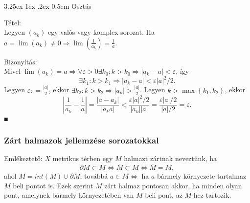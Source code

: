 \documentclass[12pt,a4paper]{scrartcl}
\makeatletter
\renewcommand\paragraph{\@startsection{paragraph}{4}{\z@}%
                                    {3.25ex \@plus1ex \@minus.2ex}%
                                    {0.5em} %
                                    {\normalfont\normalsize\bfseries}}
\newenvironment{tetel}{}{}
\newenvironment{bizonyitas}{}{}
\makeatother
\begin{document}
\hypertarget{osztas}{%
\paragraph{Osztás}\label{osztas}}

\begin{tetel}

Tétel:\\
Legyen \(\left( a_{k} \right)\) egy valós vagy komplex sorozat. Ha
\(\left. a = \lim\left( a_{k} \right) \neq 0\Rightarrow\lim\left( \frac{1}{a_{k}} \right) = \frac{1}{a} \right.\).

\end{tetel}

\begin{bizonyitas}

Bizonyítás:\\
Mivel
\(\left. \lim\left( a_{k} \right) = a\Rightarrow\forall\varepsilon > 0\exists k_{0}:k > k_{0}\Rightarrow\left| {a_{k} - a} \right| < \varepsilon \right.\),
így
\[\left. \exists k_{1}:k > k_{1}\Rightarrow\left| {a_{k} - a} \right| < \varepsilon\left| a \right|^{2}/2 \right..\]
Legyen \(\varepsilon: = \frac{\left| a \right|}{2}\), ekkor
\(\left. \exists k_{2}:k > k_{2}\Rightarrow\left| a_{k} \right| > \frac{\left| a \right|}{2} \right.\).
Legyen \(k > \max\left\{ {k_{1},k_{2}} \right\}\), ekkor
\[{\left| {\frac{1}{a_{k}} - \frac{1}{a}} \right| = \frac{\left| {a - a_{k}} \right|}{\left| {a_{k}a} \right|} < \frac{\varepsilon\left| a \right|^{2}/2}{\left| a_{k} \right|\left| a \right|} = \frac{\varepsilon\left| a \right|/2}{\left| a \right|/2} = \varepsilon}.\]
■

\end{bizonyitas}

\hypertarget{zart-halmazok-jellemzese-sorozatokkal}{%
\subsubsection{Zárt halmazok jellemzése
sorozatokkal}\label{zart-halmazok-jellemzese-sorozatokkal}}

Emlékeztető: \(X\) metrikus térben egy \(M\) halmazt zártnak neveztünk,
ha
\[\left. \partial M \subset M\Leftrightarrow\overline{M} \subset M\Leftrightarrow\overline{M} = M \right.,\]
ahol \(\overline{M} = {int}\left( M \right) \cup \partial M\), továbbá
\(\left. a \in \overline{M}\Leftrightarrow \right.\) ha \(a\) bármely
környezete tartalmaz \(M\) beli pontot is. Ezek szerint \(M\) zárt
halmaz pontosan akkor, ha minden olyan pont, amelynek bármely
környezetében van \(M\) beli pont, az \(M\)-hez tartozik.
\end{document}
